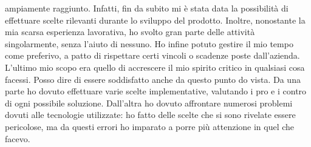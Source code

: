 			ampiamente raggiunto. Infatti, fin da subito mi è stata data la possibilità di effettuare scelte rilevanti durante lo
			sviluppo del prodotto. Inoltre, nonostante la mia scarsa esperienza lavorativa, ho svolto gran parte delle attività
			singolarmente, senza l'aiuto di nessuno. Ho infine potuto gestire il mio tempo come preferivo, a patto di rispettare certi
			vincoli o scadenze poste dall'azienda.\\
			L'ultimo mio scopo era quello di accrescere il mio spirito critico in qualsiasi cosa facessi. Posso dire di essere
			soddisfatto anche da questo punto do vista. Da una parte ho dovuto effettuare varie scelte implementative, valutando i pro e
			i contro di ogni possibile soluzione. Dall'altra ho dovuto affrontare numerosi problemi dovuti alle tecnologie utilizzate:
			ho fatto delle scelte che si sono rivelate essere pericolose, ma da questi errori ho imparato a porre più attenzione in quel
			che facevo.
